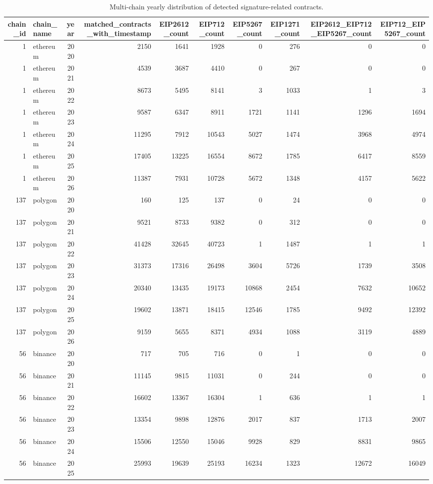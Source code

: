 \begin{table}
\caption{Multi-chain yearly distribution of detected signature-related contracts.}
\label{tab:multichain-eip-adoption}
\begin{tabular}{rlrrrrrrrr}
\toprule
chain_id & chain_name & year & matched_contracts_with_timestamp & EIP2612_count & EIP712_count & EIP5267_count & EIP1271_count & EIP2612_EIP712_EIP5267_count & EIP712_EIP5267_count \\
\midrule
1 & ethereum & 2020 & 2150 & 1641 & 1928 & 0 & 276 & 0 & 0 \\
1 & ethereum & 2021 & 4539 & 3687 & 4410 & 0 & 267 & 0 & 0 \\
1 & ethereum & 2022 & 8673 & 5495 & 8141 & 3 & 1033 & 1 & 3 \\
1 & ethereum & 2023 & 9587 & 6347 & 8911 & 1721 & 1141 & 1296 & 1694 \\
1 & ethereum & 2024 & 11295 & 7912 & 10543 & 5027 & 1474 & 3968 & 4974 \\
1 & ethereum & 2025 & 17405 & 13225 & 16554 & 8672 & 1785 & 6417 & 8559 \\
1 & ethereum & 2026 & 11387 & 7931 & 10728 & 5672 & 1348 & 4157 & 5622 \\
137 & polygon & 2020 & 160 & 125 & 137 & 0 & 24 & 0 & 0 \\
137 & polygon & 2021 & 9521 & 8733 & 9382 & 0 & 312 & 0 & 0 \\
137 & polygon & 2022 & 41428 & 32645 & 40723 & 1 & 1487 & 1 & 1 \\
137 & polygon & 2023 & 31373 & 17316 & 26498 & 3604 & 5726 & 1739 & 3508 \\
137 & polygon & 2024 & 20340 & 13435 & 19173 & 10868 & 2454 & 7632 & 10652 \\
137 & polygon & 2025 & 19602 & 13871 & 18415 & 12546 & 1785 & 9492 & 12392 \\
137 & polygon & 2026 & 9159 & 5655 & 8371 & 4934 & 1088 & 3119 & 4889 \\
56 & binance & 2020 & 717 & 705 & 716 & 0 & 1 & 0 & 0 \\
56 & binance & 2021 & 11145 & 9815 & 11031 & 0 & 244 & 0 & 0 \\
56 & binance & 2022 & 16602 & 13367 & 16304 & 1 & 636 & 1 & 1 \\
56 & binance & 2023 & 13354 & 9898 & 12876 & 2017 & 837 & 1713 & 2007 \\
56 & binance & 2024 & 15506 & 12550 & 15046 & 9928 & 829 & 8831 & 9865 \\
56 & binance & 2025 & 25993 & 19639 & 25193 & 16234 & 1323 & 12672 & 16049 \\

\end{tabular}
\end{table}
